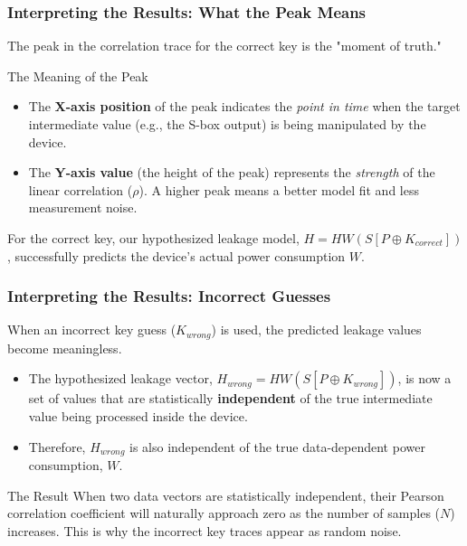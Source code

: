 \begin{frame}
    \frametitle{Interpreting the Results: What the Peak Means}

    The peak in the correlation trace for the correct key is the "moment of truth."

    \begin{block}{The Meaning of the Peak}
        \begin{itemize}
            \item The \textbf{X-axis position} of the peak indicates the \textit{point in time} when the target intermediate value (e.g., the S-box output) is being manipulated by the device.
            \item The \textbf{Y-axis value} (the height of the peak) represents the \textit{strength} of the linear correlation ($\rho$). A higher peak means a better model fit and less measurement noise.
        \end{itemize}
    \end{block}
    For the correct key, our hypothesized leakage model, $H = HW(S[P \oplus K_{correct}])$, successfully predicts the device's actual power consumption $W$.
\end{frame}

\begin{frame}
    \frametitle{Interpreting the Results: Incorrect Guesses}
    
    When an incorrect key guess ($K_{wrong}$) is used, the predicted leakage values become meaningless.
    
    \begin{itemize}
        \item The hypothesized leakage vector, $H_{wrong} = HW(S[P \oplus K_{wrong}])$, is now a set of values that are statistically \textbf{independent} of the true intermediate value being processed inside the device.
        \item Therefore, $H_{wrong}$ is also independent of the true data-dependent power consumption, $W$.
    \end{itemize}
    
    \begin{alertblock}{The Result}
        When two data vectors are statistically independent, their Pearson correlation coefficient will naturally approach zero as the number of samples ($N$) increases. This is why the incorrect key traces appear as random noise.
    \end{alertblock}
\end{frame}
